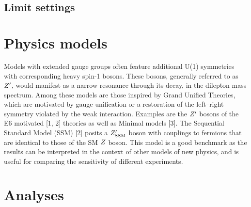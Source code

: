 \documentclass{cernrep}
\begin{document}
\subsection{Limit settings}


\section{Physics models}

Models with extended gauge groups often feature additional U(1) symmetries with corresponding heavy spin-1 bosons. These bosons, generally referred to as $Z^{\prime}$, would manifest as a narrow resonance through
its  decay,  in  the  dilepton  mass  spectrum.   
Among  these  models  are  those  inspired  by  Grand  Unified Theories, which are 
motivated by gauge unification or a restoration of the left–right symmetry violated
by the weak interaction. Examples are the $Z^{\prime}$
bosons of the E6 motivated [1, 2] theories as well as Minimal models [3].  
The Sequential Standard Model (SSM) [2] posits a $Z^{\prime}_{\mathrm{SSM}}$ boson with couplings to fermions
that are identical to those of the SM $Z$ boson. This model is a good benchmark as the 
results can be interpreted in the context of other models of new physics, and is useful 
for comparing the sensitivity of different experiments.



\section{Analyses}
\end{document}
